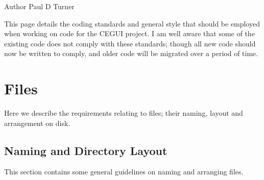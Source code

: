 \begin{DoxyAuthor}{Author}
Paul D Turner
\end{DoxyAuthor}
This page details the coding standards and general style that should be employed when working on code for the C\+E\+G\+UI project. I am well aware that some of the existing code does not comply with these standards; though all new code should now be written to comply, and older code will be migrated over a period of time.\hypertarget{code_standards_code_standards_sec_1}{}\section{Files}\label{code_standards_code_standards_sec_1}
Here we describe the requirements relating to files; their naming, layout and arrangement on disk.\hypertarget{code_standards_code_standards_sec_1_1}{}\subsection{Naming and Directory Layout}\label{code_standards_code_standards_sec_1_1}
This section contains some general guidelines on naming and arranging files.
